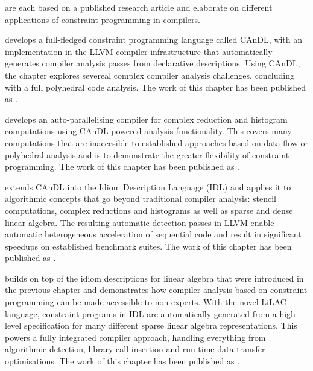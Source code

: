     {\bf{}}
    are each based on a published research article and elaborate on different
    applications of constraint programming in compilers.

    {\bf{}} develops a full-fledged constraint programming
    language called CAnDL, with an implementation in the LLVM compiler
    infrastructure that automatically generates compiler analysis passes from
    declarative descriptions.
    Using CAnDL, the chapter explores severeal complex compiler analysis
    challenges, concluding with a full polyhedral code analysis.
    The work of this chapter has been published as
    {\bf\citet{Ginsbach:2018:CDS:3178372.3179515}}.

    {\bf{}} develops an auto-parallelising compiler for
    complex reduction and histogram computations using CAnDL-powered analysis
    functionality.
    This covers many computations that are inaccesible to established approaches
    based on data flow or polyhedral analysis and is to demonstrate the greater
    flexibility of constraint programming.
    The work of this chapter has been published as
    {\bf\citet{ginsbach2017discovery}}.

    {\bf{}} extends CAnDL into the Idiom Description Language
    (IDL) and applies it to algorithmic concepts that go beyond traditional
    compiler analysis: stencil computations, complex reductions and histograms
    as well as sparse and dense linear algebra.
    The resulting automatic detection passes in LLVM enable automatic
    heterogeneous acceleration of sequential code and result in significant
    speedups on established benchmark suites.
    The work of this chapter has been published as
    {\bf\citet{Ginsbach:2018:AML:3173162.3173182}}.

    {\bf{}} builds on top of the idiom descriptions for linear
    algebra that were introduced in the previous chapter and demonstrates how
    compiler analysis based on constraint programming can be made accessible to
    non-experts.
    With the novel LiLAC language, constraint programs in IDL are automatically
    generated from a high-level specification for many different sparse linear
    algebra representations.
    This powers a fully integrated compiler approach, handling everything from
    algorithmic detection, library call insertion and run time data transfer
    optimisations.
    The work of this chapter has been published as \citet{lilacpaper}.
